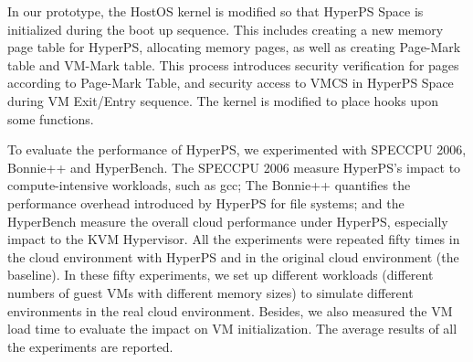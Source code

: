 In our prototype, the HostOS kernel is modified so that HyperPS Space is initialized during the boot up sequence. This includes creating a new memory page table for HyperPS, allocating memory pages, as well as creating Page-Mark table and VM-Mark table. This process introduces security verification for pages according to Page-Mark Table, and security access to VMCS in HyperPS Space during VM Exit/Entry sequence.
The kernel is modified to place hooks upon some functions.

To evaluate the performance of HyperPS, we experimented with SPECCPU 2006, Bonnie++ and HyperBench. The SPECCPU 2006 measure HyperPS's impact to compute-intensive workloads, such as gcc; The Bonnie++ quantifies the performance overhead introduced by HyperPS for file systems; and the HyperBench measure the overall cloud performance under HyperPS, especially impact to the KVM Hypervisor.
All the experiments were repeated fifty times in the cloud environment with HyperPS and in the original cloud environment (the baseline).
In these fifty experiments, we set up different workloads (different numbers of guest VMs with different memory sizes) to simulate different environments in the real cloud environment. 
Besides, we also measured the VM load time to evaluate the impact on VM initialization.
The average results of all the experiments are reported. 






